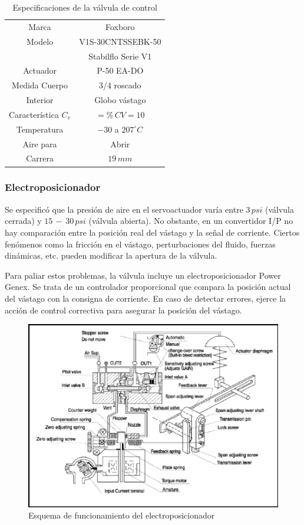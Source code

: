 \begin{table}[ht]
\renewcommand{\arraystretch}{1.3}
\centering
 \begin{tabular}{|c|c|}
  \hline
  Marca & Foxboro\\
  Modelo & V1S-30CNTSSEBK-50\\
	& Stabilflo Serie V1\\
 Actuador & P-50 EA-DO\\
 Medida Cuerpo & 3/4 roscado\\
 Interior & Globo vástago\\
 Característica $C_v$ & $=\%\,CV=10$\\
 Temperatura & $-30$ a $207^\circ C$\\
 Aire para & Abrir  \\
 Carrera & $19\,mm$ \\
  \hline
 \end{tabular}
 \caption{Especificaciones de la válvula de control}
 \label{tab:especifValvs}
\end{table}

\subsubsection{Electroposicionador}
Se especificó que la presión de aire en el servoactuador varía entre $3\,psi$
(válvula cerrada) y $15\,-\,30\,psi$ (válvula abierta).
No obstante, en un convertidor I/P no hay comparación entre
la posición real del vástago y la señal de corriente.
Ciertos fenómenos como la fricción en el vástago, perturbaciones del fluido,
fuerzas dinámicas, etc. pueden modificar la apertura de la válvula.

Para paliar estos problemas, la válvula incluye un electroposicionador Power
Genex.
Se trata de un controlador proporcional que compara la posición actual del
vástago con la consigna de corriente.
En caso de detectar errores, ejerce la acción de control correctiva para
asegurar la posición del vástago.

\begin{figure}[t]
 \centering
 \includegraphics[scale=1.1]{Cap2-DisenoEnsamblado/images/PG-EPL.pdf}
 \caption{Esquema de funcionamiento del electroposicionador}
 \label{fig:elp-funcionamiento}
\end{figure}

